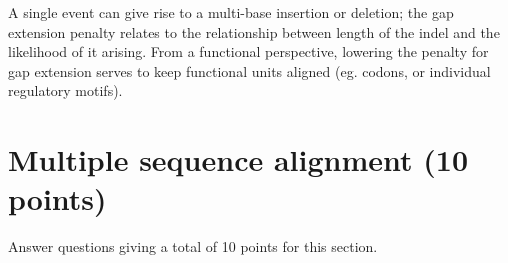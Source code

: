 \documentclass[11pt]{article}
\begin{document}
\begin{enumerate}
\begin{Notes}
  A single event can give rise to a multi-base insertion or deletion; the gap
  extension penalty relates to the relationship between length of the indel
  and the likelihood of it arising. From a functional perspective, lowering
  the penalty for gap extension serves to keep functional units aligned
  (eg. codons, or individual regulatory motifs).  
\end{Notes}
\end{enumerate}

\section{Multiple sequence alignment (10 points)}
Answer questions giving a total of 10 points for this section.
\end{document}
